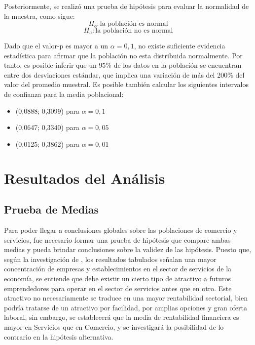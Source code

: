 \documentclass[12pt,a4paper,twoside]{article}
\begin{document}
Posteriormente, se realizó una prueba de hipótesis para evaluar la normalidad de la muestra, como sigue:
$$H_{o}: \text{la población es normal}$$
$$H_{a}: \text{la población no es normal}$$
\begin{figure}[H]
\end{figure}
Dado que el valor-p es mayor a un $\alpha=0,1$, no existe suficiente evidencia estadística para afirmar que la población no esta distribuida normalmente. Por tanto, es posible inferir que un 95\% de los datos en la población se encuentran entre dos desviaciones estándar, que implica una variación de más del 200\% del valor del promedio muestral. Es posible también calcular los siguientes intervalos de confianza para la media poblacional:
\begin{itemize}
    \item (0,0888; 0,3099) para $\alpha=0,1$
    \item (0,0647; 0,3340) para $\alpha=0,05$
    \item (0,0125; 0,3862) para $\alpha=0,01$
\end{itemize}
\section{Resultados del Análisis}
\subsection{Prueba de Medias}
Para poder llegar a conclusiones globales sobre las poblaciones de comercio y servicios, fue necesario formar una prueba de hipótesis que compare ambas medias y pueda brindar conclusiones sobre la validez de las hipótesis. Puesto que, según la investigación de \textcite{directoriodeinstitutodeestadisticaycensosb}, los resultados tabulados señalan una mayor concentración de empresas y establecimientos en el sector de servicios de la economía, se entiende que debe existir un cierto tipo de atractivo a futuros emprendedores para operar en el sector de servicios antes que en otro. Este atractivo no necesariamente se traduce en una mayor rentabilidad sectorial, bien podría tratarse de un atractivo por facilidad, por amplias opciones y gran oferta laboral, sin embargo, se establecerá que la media de rentabilidad financiera es mayor en Servicios que en Comercio, y se investigará la posibilidad de lo contrario en la hipótesis alternativa. 
\end{document}
